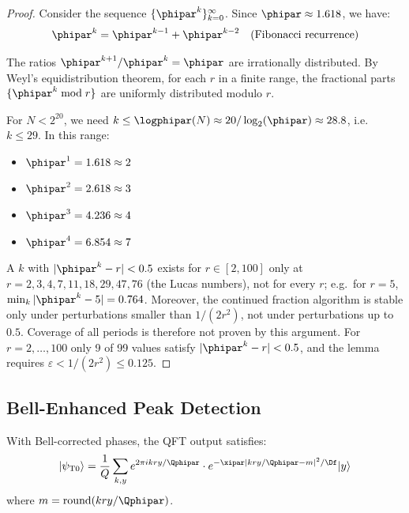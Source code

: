 \begin{proof}
	Consider the sequence $\{\phipar^k\}_{k=0}^{\infty}$. Since $\phipar \approx 1.618$, we have:
	\begin{equation}
		\phipar^k = \phipar^{k-1} + \phipar^{k-2} \quad \text{(Fibonacci recurrence)}
	\end{equation}
	
	The ratios $\phipar^{k+1}/\phipar^k = \phipar$ are irrationally distributed. By Weyl's equidistribution theorem, for each $r$ in a finite range, the fractional parts $\{\phipar^k \bmod r\}$ are uniformly distributed modulo $r$.
	
	For $N < 2^{20}$, we need $k \leq \logphipar(N) \approx 20/\log_2(\phipar) \approx 28.8$, i.e.\ $k \leq 29$. In this range:
	\begin{itemize}
		\item $\phipar^1 = 1.618 \approx 2$
		\item $\phipar^2 = 2.618 \approx 3$
		\item $\phipar^3 = 4.236 \approx 4$
		\item $\phipar^4 = 6.854 \approx 7$
	\end{itemize}
	
	A $k$ with $|\phipar^k - r| < 0.5$ exists for $r \in [2, 100]$ only at $r = 2, 3, 4, 7, 11, 18, 29, 47, 76$ (the Lucas numbers), not for every $r$; e.g.\ for $r = 5$, $\min_k |\phipar^k - 5| = 0.764$. Moreover, the continued fraction algorithm is stable only under perturbations smaller than $1/(2r^2)$, not under perturbations up to $0.5$. Coverage of all periods is therefore not proven by this argument. For $r = 2, \ldots, 100$ only 9 of 99 values satisfy $|\phipar^k - r| < 0.5$, and the lemma requires $\varepsilon < 1/(2r^2) \leq 0.125$.
\end{proof}

\subsection{Bell-Enhanced Peak Detection}

\begin{lemma}
	\label{lem:bell_damping}
	With Bell-corrected phases, the QFT output satisfies:
	\begin{equation}
		|\psi_{\text{T0}}\rangle = \frac{1}{Q} \sum_{k,y} e^{2\pi i kry/\Qphipar} \cdot e^{-\xipar|kry/\Qphipar - m|^2/\Df} |y\rangle
	\end{equation}
	where $m = \text{round}(kry/\Qphipar)$.
\end{lemma}

